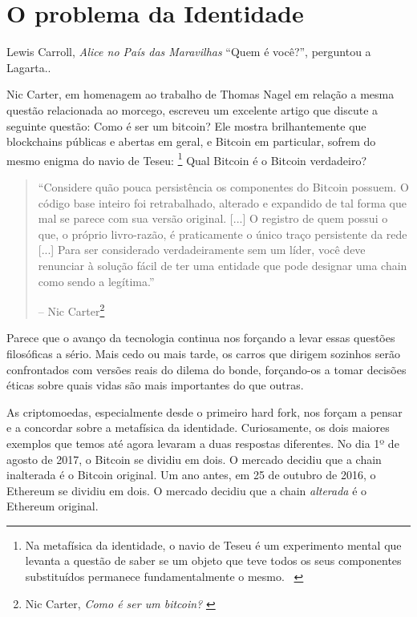 \chapter{O problema da Identidade}
\label{les:4}

\begin{chapquote}{Lewis Carroll, \textit{Alice no País das Maravilhas}}
  \enquote{Quem é você?}, perguntou a Lagarta..
\end{chapquote}

Nic Carter, em homenagem ao trabalho de Thomas Nagel em relação a mesma questão relacionada ao morcego, escreveu um excelente artigo que discute a seguinte questão: Como é ser um bitcoin? Ele mostra brilhantemente que blockchains públicas e abertas em geral, e Bitcoin em particular, sofrem do mesmo enigma do navio de Teseu: \footnote{Na metafísica da identidade, o navio de Teseu é um experimento mental que levanta a questão de saber se um objeto que teve todos os seus componentes substituídos permanece fundamentalmente o mesmo. ~\cite{wiki:theseus}} Qual Bitcoin é o Bitcoin verdadeiro?

\begin{quotation}\begin{samepage}
\enquote{Considere quão pouca persistência os componentes do Bitcoin possuem. O código base inteiro foi retrabalhado, alterado e expandido de tal forma que mal se parece com sua versão original. [...] O registro de quem possui o que, o próprio livro-razão, é praticamente o único traço persistente da rede [...] Para ser considerado verdadeiramente sem um líder, você deve renunciar à solução fácil de ter uma entidade que pode designar uma chain como sendo a legítima.}
\begin{flushright} -- Nic Carter\footnote{Nic Carter, \textit{Como é ser um bitcoin?} \cite{bitcoin-identity}}
\end{flushright}\end{samepage}\end{quotation}

Parece que o avanço da tecnologia continua nos forçando a levar essas questões filosóficas a sério. Mais cedo ou mais tarde, os carros que dirigem sozinhos serão confrontados com versões reais do dilema do bonde, forçando-os a tomar decisões éticas sobre quais vidas são mais importantes do que outras.

As criptomoedas, especialmente desde o primeiro hard fork, nos forçam a pensar e a concordar sobre a metafísica da identidade. Curiosamente, os dois maiores exemplos que temos até agora levaram a duas respostas diferentes. No dia 1º de agosto de 2017, o Bitcoin se dividiu em dois. O mercado decidiu que a chain inalterada é o Bitcoin original. Um ano antes, em 25 de outubro de 2016, o Ethereum se dividiu em dois. O mercado decidiu que a chain \textit{alterada} é o Ethereum original.

